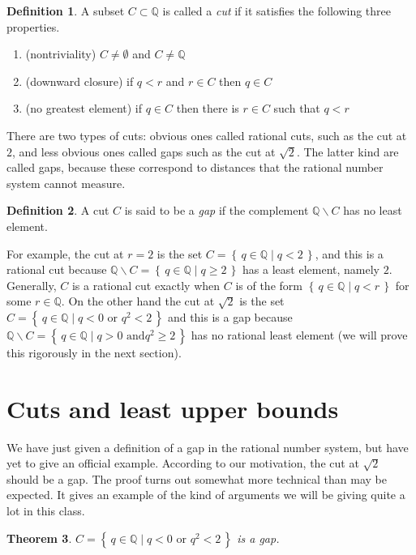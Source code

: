 \documentclass[11pt,oneside]{amsbook}
\newcommand{\set}[1]{\left\{\,#1\,\right\}}
\newcommand{\QQ}{\mathbb Q}
\theoremstyle{definition}
\theoremstyle{plain}
\newtheorem{thm}{Theorem}[section]
\theoremstyle{definition}
\newtheorem{defn}[thm]{Definition}
\theoremstyle{remark}
\numberwithin{equation}{section}
\numberwithin{figure}{section}
\begin{document}
\begin{defn}
  A subset $C\subset\QQ$ is called a \emph{cut} if it satisfies the following three properties.
  \begin{enumerate}
  \item (nontriviality) $C\neq\emptyset$ and $C\neq\QQ$
  \item (downward closure) if $q<r$ and $r\in C$ then $q\in C$
  \item (no greatest element) if $q\in C$ then there is $r\in C$ such that $q<r$
  \end{enumerate}
\end{defn}

There are two types of cuts: obvious ones called rational cuts, such as the cut at $2$, and less obvious ones called gaps such as the cut at $\sqrt2$. The latter kind are called gaps, because these correspond to distances that the rational number system cannot measure.

\begin{defn}
  A cut $C$ is said to be a \emph{gap} if the complement $\QQ\smallsetminus C$ has no least element.
\end{defn}

For example, the cut at $r=2$ is the set $C=\set{q\in\QQ\mid q<2}$, and this is a rational cut because $\QQ\smallsetminus C=\set{q\in\QQ\mid q\geq2}$ has a least element, namely $2$. Generally, $C$ is a rational cut exactly when $C$ is of the form $\set{q\in\QQ\mid q<r}$ for some $r\in\QQ$. On the other hand the cut at $\sqrt2$ is the set $C=\set{q\in\QQ\mid q<0\text{ or }q^2<2}$ and this is a gap because $\QQ\smallsetminus C=\set{q\in\QQ\mid q>0\text{ and}q^2\geq2}$ has no rational least element (we will prove this rigorously in the next section).

\newpage
\section{Cuts and least upper bounds}

We have just given a definition of a gap in the rational number system, but have yet to give an official example. According to our motivation, the cut at $\sqrt2$ should be a gap. The proof turns out somewhat more technical than may be expected. It gives an example of the kind of arguments we will be giving quite a lot in this class.

\begin{thm}
  \label{thm:root-2-cut}
  $C=\set{q\in\QQ\mid q<0\text{ or }q^2<2}$ is a gap.
\end{thm}
\end{document}
